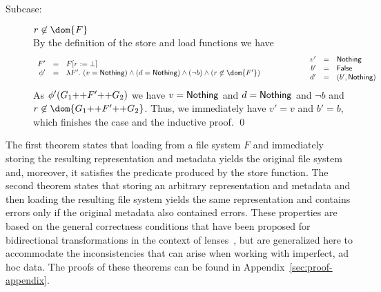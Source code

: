 {\begin{description}
\begin{description}
\item[Subcase:] $r \not\in \dom{F}$\\[1ex]
%
By the definition of the store and load functions we have
\[
\begin{array}{rcl}
F' &=& \FDelete{F}{r}\\
\phi' &=& \lambda F'.~(v = \Nothing) \wedge (d = \Nothing) \wedge (\neg b) \wedge (r \not\in \dom{F'})\\
\end{array}\hspace*{2cm}\begin{array}{rcl}
v' &=& \Nothing\\
b' &=& \False\\
d' &=& (b',\Nothing)\\
\end{array}
\]
As $\phi'(G_1 \text{++} F' \text{++} G_2)$ we have $v = \mathsf{Nothing}$ and $d
= \mathsf{Nothing}$ and $\neg b$ and $r \not\in \dom{G_1 \FAppend F' \FAppend
  G_2}$. Thus, we immediately have $v' = v$ and $b' = b$, which finishes the case and
the inductive proof. \hfill \qed
\end{description}
\end{description}}

\smallskip

\noindent The first theorem states that loading from a file system $F$
and immediately storing the resulting representation and metadata
yields the original file system and, moreover, it satisfies the
predicate produced by the store function. The second theorem states
that storing an arbitrary representation and metadata and then loading
the resulting file system yields the same representation and contains
errors only if the original metadata also contained errors. These
properties are based on the general correctness conditions that have
been proposed for bidirectional transformations in the context of
lenses~\cite{lenses}, but are generalized here to accommodate the
inconsistencies that can arise when working with imperfect, ad hoc
data. The proofs of these theorems can be found in
Appendix~\ref{sec:proof-appendix}. 

